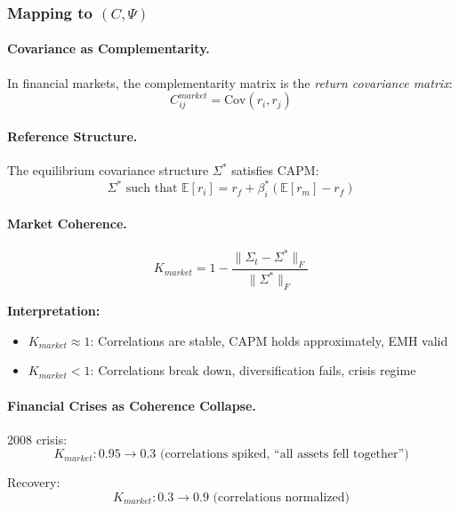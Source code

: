 \documentclass[12pt,a4paper]{article}
\begin{document}
\subsubsection{Mapping to $(C, \Psi)$}

\paragraph{Covariance as Complementarity.}
In financial markets, the complementarity matrix is the \emph{return covariance matrix}:
\begin{equation}
  C^{market}_{ij} = \text{Cov}(r_i, r_j)
\end{equation}

\paragraph{Reference Structure.}
The equilibrium covariance structure $\Sigma^*$ satisfies CAPM:
\begin{equation}
  \Sigma^* \text{ such that } \mathbb{E}[r_i] = r_f + \beta_i^* (\mathbb{E}[r_m] - r_f)
\end{equation}

\paragraph{Market Coherence.}
\begin{equation}
  K_{market} = 1 - \frac{\|\Sigma_t - \Sigma^*\|_F}{\|\Sigma^*\|_F}
\end{equation}

\textbf{Interpretation:}
\begin{itemize}
  \item $K_{market} \approx 1$: Correlations are stable, CAPM holds approximately, EMH valid
  \item $K_{market} < 1$: Correlations break down, diversification fails, crisis regime
\end{itemize}

\paragraph{Financial Crises as Coherence Collapse.}
2008 crisis:
\begin{equation}
  K_{market} : 0.95 \to 0.3 \text{ (correlations spiked, ``all assets fell together'')}
\end{equation}

Recovery:
\begin{equation}
  K_{market} : 0.3 \to 0.9 \text{ (correlations normalized)}
\end{equation}
\end{document}

